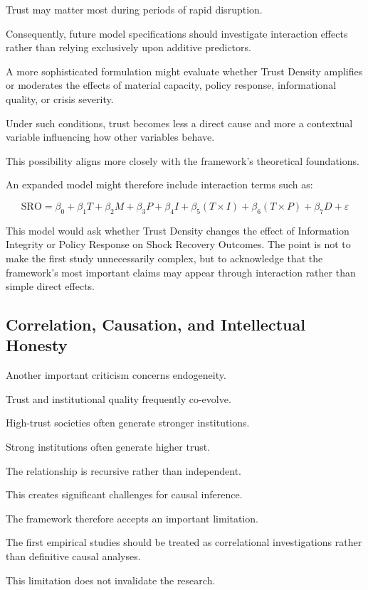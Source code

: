 \documentclass[12pt]{article}
\begin{document}
Trust may matter most during periods of rapid disruption.

Consequently, future model specifications should investigate interaction effects rather than relying exclusively upon additive predictors.

A more sophisticated formulation might evaluate whether Trust Density amplifies or moderates the effects of material capacity, policy response, informational quality, or crisis severity.

Under such conditions, trust becomes less a direct cause and more a contextual variable influencing how other variables behave.

This possibility aligns more closely with the framework's theoretical foundations.

An expanded model might therefore include interaction terms such as:

\[
\mathrm{SRO}=\beta_0+\beta_1T+\beta_2M+\beta_3P+\beta_4I+\beta_5(T\times I)+\beta_6(T\times P)+\beta_7D+\varepsilon
\]

This model would ask whether Trust Density changes the effect of Information Integrity or Policy Response on Shock Recovery Outcomes. The point is not to make the first study unnecessarily complex, but to acknowledge that the framework's most important claims may appear through interaction rather than simple direct effects.

\subsection{Correlation, Causation, and Intellectual Honesty}

Another important criticism concerns endogeneity.

Trust and institutional quality frequently co-evolve.

High-trust societies often generate stronger institutions.

Strong institutions often generate higher trust.

The relationship is recursive rather than independent.

This creates significant challenges for causal inference.

The framework therefore accepts an important limitation.

The first empirical studies should be treated as correlational investigations rather than definitive causal analyses.

This limitation does not invalidate the research.
\end{document}
